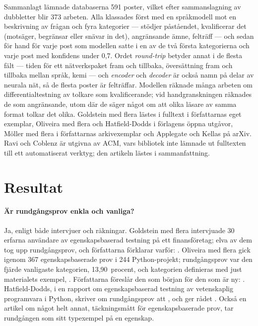 Sammanlagt lämnade databaserna 591 poster, vilket efter sammanslagning
av dubbletter blir 373 arbeten.  Alla klassades först med en
språkmodell mot en beskrivning av frågan och fyra kategorier ---
stödjer påståendet, kvalificerar det (motsäger, begränsar eller snävar
in det), angränsande ämne, felträff --- och sedan för hand för varje
post som modellen satte i en av de två första kategorierna och varje
post med konfidens under 0,7.  Ordet \emph{round-trip} betyder annat i
de flesta fält --- tiden för ett nätverkspaket fram och tillbaka,
översättning fram och tillbaka mellan språk, kemi --- och \emph{encoder}
och \emph{decoder} är också namn på delar av neurala nät, så de flesta
poster är felträffar.  Modellen räknade många arbeten om
differentialtestning av tolkare som kvalificerande; vid
handgranskningen räknades de som angränsande, utom där de säger något om
att olika läsare av samma format tolkar det olika.  Goldstein med flera
lästes i fulltext i författarnas eget exemplar, Oliveira med flera och
Hatfield-Dodds i förlagens öppna utgåvor, Möller med flera i
författarnas arkivexemplar och Applegate och Kellas på arXiv.  Ravi och
Coblenz är utgivna av ACM, vars bibliotek inte lämnade ut fulltexten
till ett automatiserat verktyg; den artikeln lästes i sammanfattning.

\section{Resultat}
\label{sec:rg-resultat}

\paragraph{Är rundgångsprov enkla och vanliga?}  Ja, enligt både
intervjuer och räkningar.  Goldstein med flera intervjuade 30 erfarna
användare av egenskapsbaserad testning på ett finansföretag; elva av dem
tog upp rundgångsprov, och författarna förklarar varför:
.  Oliveira med flera gick igenom 367 egenskapsbaserade prov i
244 Python-projekt; rundgångsprov var den fjärde vanligaste kategorien,
13,90~procent\autocite[10]{Oliveira2026PBT}, och kategorien definieras
med just materialets exempel, .  Författarna föreslår den
som början för den som är ny: .
Hatfield-Dodds, i en rapport om egenskapsbaserad testning av
vetenskaplig programvara i Python, skriver om rundgångsprov att , och ger rådet .  Också en artikel om något helt annat, täckningsmått för
egenskapsbaserade prov, tar rundgången som sitt typexempel på en
egenskap\autocite{Coultas2026PropCov}.

